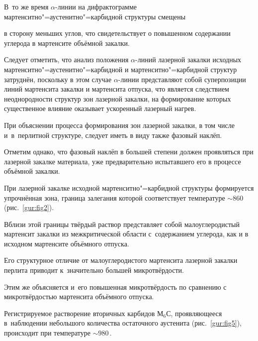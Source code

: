 В~то же время $\alpha $-линии на дифрактограмме мартенситно"=аустенитно"=карбидной структуры смещены

в сторону меньших углов, что свидетельствует о повышенном содержании углерода в мартенсите объёмной закалки.









Следует отметить, что анализ положения $\alpha $-линий лазерной закалки исходных мартенситно"=аустенитно"=карбидной и мартенситно"=карбидной структур затруднён,  поскольку в этом случае $\alpha $-линии представляют собой суперпозиции линий мартенсита закалки и мартенсита отпуска, что является следствием неоднородности структур зон лазерной закалки, на формирование которых существенное влияние оказывает ускоренный лазерный нагрев.



При объяснении процесса формирования зон лазерной закалки, в том числе и~в~перлитной структуре, следует иметь в виду также фазовый наклёп. 

Отметим однако, что фазовый наклёп в большей степени должен проявляться при лазерной закалке материала, уже предварительно испытавшего его в процессе объёмной закалки.





При лазерной закалке исходной мартенситно"=карбидной структуры формируется упрочнённая зона, граница залегания которой соответствует температуре \mbox{$\sim  860$\,\textcelsius} (рис.~\ref{gur:fig2}). 

Вблизи этой границы твёрдый раствор представляет собой малоуглеродистый мартенсит закалки из межкритической области с~содержанием углерода, как и в исходном мартенсите объёмного отпуска. 

Его структурное отличие от малоуглеродистого мартенсита лазерной закалки перлита приводит к~значительно большей микротвёрдости. 

Этим же объясняется и~его повышенная микротвёрдость по сравнению с микротвёрдостью мартенсита объёмного отпуска.







Регистрируемое растворение вторичных карбидов М$_6$С, проявляющееся в~наблюдении небольшого количества остаточного аустенита (рис.~\ref{gur:fig5}), происходит при температуре $\sim  980$\,\textcelsius. 

